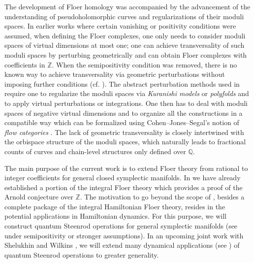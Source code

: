 \documentclass[reqno, 10pt]{amsart}
\numberwithin{equation}{section}
\numberwithin{equation}{section}
\theoremstyle{definition}
\theoremstyle{remark}
\newcommand{\mb}{\mathbb}
\begin{document}
The development of Floer homology was accompanied by the advancement of the understanding of pseudoholomorphic curves \cite{Gromov_1985} and regularizations of their moduli spaces. In earlier works \cite{Floer_CMP}\cite{Hofer_Salamon}\cite{Ono_1995} where certain vanishing or positivity conditions were assumed, when defining the Floer complexes, one only needs to consider moduli spaces of virtual dimensions at most one; one can achieve transversality of such moduli spaces by perturbing geometrically and can obtain Floer complexes with coefficients in ${\mb Z}$. When the semipositivity condition was removed, there is no known way to achieve transversality via geometric perturbations without imposing further conditions (cf. \cite{Cieliebak_Mohnke}). The abstract perturbation methods used in \cite{Liu_Tian_Floer}\cite{Fukaya_Ono}\cite{HWZ_book}\cite{Pardon_virtual} require one to regularize the moduli spaces via {\it Kuranishi models} or {\it polyfolds} and to apply virtual perturbations or integrations. One then has to deal with moduli spaces of negative virtual dimensions and to organize all the constructions in a compatible way which can be formalized using Cohen--Jones--Segal's notion of  {\it flow categories} \cite{Cohen_Jones_Segal}. The lack of geometric transversality is closely intertwined with the orbispace structure of the moduli spaces, which naturally leads to fractional counts of   curves and chain-level structures only defined over ${\mb Q}$.

The main purpose of the current work is to extend Floer theory from rational to integer coefficients for general closed symplectic manifolds. In \cite{Bai_Xu_Arnold} we have already established a portion of the integral Floer theory which provides a proof of the Arnold conjecture over ${\mb Z}$. The motivation to go beyond the scope of \cite{Bai_Xu_Arnold}, besides a complete package of the integral Hamiltonian Floer theory, resides in the potential applications in Hamiltonian dynamics. For this purpose, we will construct quantum Steenrod operations for general symplectic manifolds (see \cite{Wilkins_2020}\cite{Seidel_Wilkins_2022}\cite{Seidel_pants}\cite{shelukhin-zhao} under semipositivity or stronger assumptions). In an upcoming joint work with Shelukhin and Wilkins \cite{BSWX}, we will extend many dynamical applications (see \cite{shelukhin20}\cite{shelukhin-21}\cite{shelukhin-22}\cite{CGG}\cite{Atallah_Lou}) of quantum Steenrod operations to greater generality. %
\end{document}
